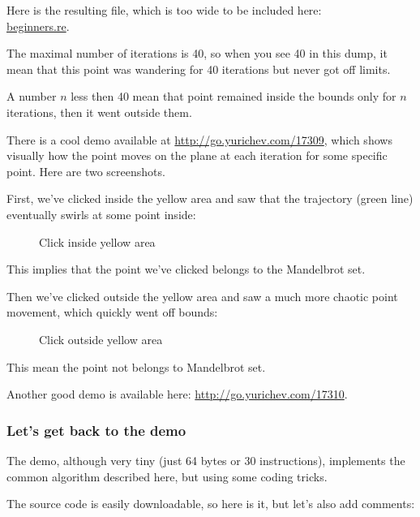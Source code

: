 

Here is the resulting file, 
which is too wide to be included here: \\
\href{http://go.yurichev.com/17164}{beginners.re}.


The maximal number of iterations is 40, so when you see 40 in this dump, it mean that this point was wandering
for 40 iterations but never got off limits. 

A number $n$ less then 40 mean that point remained inside the bounds only for $n$ iterations, 
then it went outside them.

\clearpage
There is a cool demo available at 
\url{http://go.yurichev.com/17309}, which shows
visually how the point moves on the plane at each iteration for some specific point. 
Here are two screenshots.

%
First, we've clicked inside the yellow area and saw that the trajectory (green line)
eventually swirls at some point inside:

\begin{figure}[H]
\centering
{}
\caption{Click inside yellow area}
\end{figure}


This implies that the point we've clicked belongs to the Mandelbrot set.

\clearpage

Then we've clicked outside the yellow area and saw a much more chaotic point movement, 
which quickly went off bounds:

\begin{figure}[H]
\centering
{}
\caption{Click outside yellow area}
\end{figure}

This mean the point not belongs 
to Mandelbrot set.

Another good demo is available here: 
\url{http://go.yurichev.com/17310}.

\clearpage
\subsubsection{Let's get back to the demo}


The demo, although very tiny (just 64 bytes or 30 instructions), implements the common algorithm 
described here, but using some coding tricks.

%
The source code is easily downloadable, so here is it, but let's also add comments:

